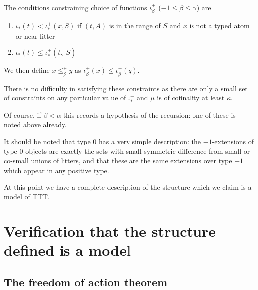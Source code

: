 \documentclass[112pt]{article}
\begin{document}
\begin{description}
\begin{comment}
\end{comment}

The conditions constraining choice of functions $\iota^+_\beta$ ($-1 \leq \beta \leq \alpha$) are

\begin{enumerate}

\item $\iota_*(t) < \iota^+_*(x,S)$ if $(t,A)$ is in the range of $S$ and $x$ is not a typed atom or near-litter

\item $\iota_*(t) \leq \iota^+_*(t_\gamma,S)$

\end{enumerate}

We then define $x \leq^+_\beta y$ as $\iota^+_\beta(x) \leq \iota^+_\beta(y)$.

There is no difficulty in satisfying these constraints as there are only a small set of constraints on any particular value of $\iota_*^+$ and $\mu$ is of cofinality at least $\kappa$.

Of course, if $\beta<\alpha$ this records a hypothesis of the recursion:  one of these is noted above already.


   It should be noted that type 0 has a very simple description:  the $-1$-extensions of type 0 objects are exactly the sets with small symmetric difference from small or co-small unions of litters, and that these are the same extensions over type $-1$ which appear in any positive type.




\begin{comment}

NOTE TO SELF:  write out the back and forth argument in more detail for communication with Sky

\end{comment}

At this point we have a complete description of the structure which we claim is a model of TTT.


\end{description}

\section{Verification that the structure defined is a model}

\subsection{The freedom of action theorem}
\end{document}
